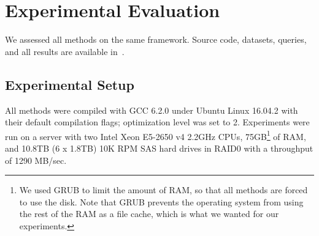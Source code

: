 \section{Experimental Evaluation}
\label{sec:experiments}
{\color{black}
We assessed all methods on the same framework. 
Source code, datasets, queries, and all results are available in~\cite{url/DSSeval2}.










\vspace{1cm}



\subsection{Experimental Setup}
\label{subsec:framework}
\label{subsec:environment}

All methods were compiled with GCC 6.2.0 under Ubuntu Linux 16.04.2 with their default compilation flags; optimization level was set to 2. 
Experiments were run on a server with two Intel Xeon E5-2650 v4 2.2GHz CPUs,
75GB\footnote{We used GRUB to limit the amount of RAM, so that all methods are forced to use the disk. Note that GRUB prevents the operating system from using the rest of the RAM as a file cache, which is what we wanted for our experiments.} of RAM, 
and 10.8TB (6 x 1.8TB) 10K RPM SAS hard drives 
in RAID0 with a throughput of 1290 MB/sec.


}
